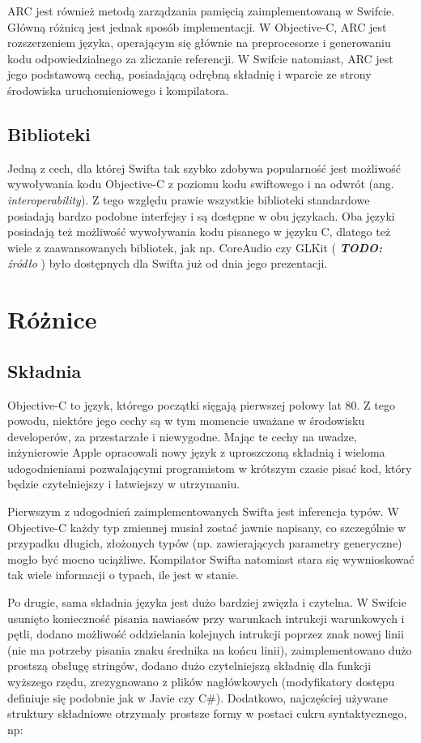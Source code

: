 \documentclass[mgr, shortabstract]{iithesis}
\newcommand{\todo}[1]{
  \textit{\textbf{TODO: }#1}
}
\newcommand{\ang}[1]{ang. \textit{#1}}
\begin{document}
ARC jest również metodą zarządzania pamięcią zaimplementowaną w Swifcie. Główną różnicą jest jednak sposób implementacji. W Objective-C, ARC jest rozszerzeniem języka, operającym się głównie na preprocesorze i generowaniu kodu odpowiedzialnego za zliczanie referencji. W Swifcie natomiast, ARC jest jego podstawową cechą, posiadającą odrębną składnię i wparcie ze strony środowiska uruchomieniowego i kompilatora.

\subsection{Biblioteki}

Jedną z cech, dla której Swifta tak szybko zdobywa popularność jest możliwość wywoływania kodu Objective-C z poziomu kodu swiftowego i na odwrót (\ang{interoperability}). Z tego względu prawie wszystkie biblioteki standardowe posiadają bardzo podobne interfejsy i są dostępne w obu językach. Oba języki posiadają też możliwość wywoływania kodu pisanego w języku C, dlatego też wiele z zaawansowanych bibliotek, jak np. CoreAudio czy GLKit (\todo{źródło}) było dostępnych dla Swifta już od dnia jego prezentacji.

\section{Różnice}

\subsection{Składnia}

Objective-C to język, którego początki sięgają pierwszej połowy lat 80. Z tego powodu, niektóre jego cechy są w tym momencie uważane w środowisku developerów, za przestarzałe i niewygodne. Mając te cechy na uwadze, inżynierowie Apple opracowali nowy język z uproszczoną składnią i wieloma udogodnieniami pozwalającymi programistom w krótszym czasie pisać kod, który będzie czytelniejszy i łatwiejszy w utrzymaniu.

Pierwszym z udogodnień zaimplementowanych Swifta jest inferencja typów. W Objective-C każdy typ zmiennej musiał zostać jawnie napisany, co szczególnie w przypadku długich, złożonych typów (np. zawierających parametry generyczne) mogło być mocno uciążliwe. Kompilator Swifta natomiast stara się wywnioskować tak wiele informacji o typach, ile jest w stanie.

Po drugie, sama składnia języka jest dużo bardziej zwięzła i czytelna. W Swifcie usunięto konieczność pisania nawiasów przy warunkach intrukcji warunkowych i pętli, dodano możliwość oddzielania kolejnych intrukcji poprzez znak nowej linii (nie ma potrzeby pisania znaku średnika na końcu linii), zaimplementowano dużo prostszą obsługę stringów, dodano dużo czytelniejszą składnię dla funkcji wyższego rzędu, zrezygnowano z plików nagłówkowych (modyfikatory dostępu definiuje się podobnie jak w Javie czy C\#). Dodatkowo, najczęściej używane struktury składniowe otrzymały prostsze formy w postaci cukru syntaktycznego, np:
\end{document}
